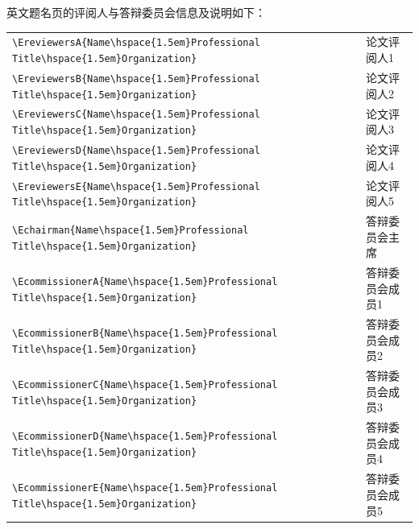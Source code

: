 英文题名页的评阅人与答辩委员会信息及说明如下：

{
\linespread{1}
\noindent
\begin{tabular}{ll}
\verb+\EreviewersA{Name\hspace{1.5em}Professional Title\hspace{1.5em}Organization}+ & 论文评阅人1\\
\verb+\EreviewersB{Name\hspace{1.5em}Professional Title\hspace{1.5em}Organization}+ & 论文评阅人2\\
\verb+\EreviewersC{Name\hspace{1.5em}Professional Title\hspace{1.5em}Organization}+ & 论文评阅人3\\
\verb+\EreviewersD{Name\hspace{1.5em}Professional Title\hspace{1.5em}Organization}+ & 论文评阅人4\\
\verb+\EreviewersE{Name\hspace{1.5em}Professional Title\hspace{1.5em}Organization}+ & 论文评阅人5\\
\verb+\Echairman{Name\hspace{1.5em}Professional Title\hspace{1.5em}Organization}+ & 答辩委员会主席\\
\verb+\EcommissionerA{Name\hspace{1.5em}Professional Title\hspace{1.5em}Organization}+ & 答辩委员会成员1\\
\verb+\EcommissionerB{Name\hspace{1.5em}Professional Title\hspace{1.5em}Organization}+ & 答辩委员会成员2\\
\verb+\EcommissionerC{Name\hspace{1.5em}Professional Title\hspace{1.5em}Organization}+ & 答辩委员会成员3\\
\verb+\EcommissionerD{Name\hspace{1.5em}Professional Title\hspace{1.5em}Organization}+ & 答辩委员会成员4\\
\verb+\EcommissionerE{Name\hspace{1.5em}Professional Title\hspace{1.5em}Organization}+ & 答辩委员会成员5\\
\end{tabular}
}

